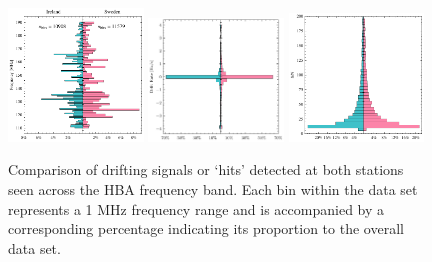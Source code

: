 \begin{figure}
    \centering
    \includegraphics[width = 0.32\textwidth]{SETI/figures/narrowband/hits_comparative_histogram.pdf}
    \includegraphics[width = 0.32\textwidth]{SETI/figures/narrowband/DR_comparative_histogram.pdf}
    \includegraphics[width = 0.32\textwidth]{SETI/figures/narrowband/SN_comparative_histogram.pdf}
    \caption{Comparison of drifting signals or `hits' detected at both stations seen across the HBA frequency band. Each bin within the data set represents a 1 MHz frequency range and is accompanied by a corresponding percentage indicating its proportion to the overall data set.}
    \label{fig:histogram_hits_comparison}
\end{figure}
